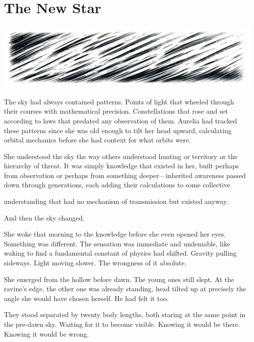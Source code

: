 \chapter{The New Star}
\label{ch:04}



\begin{center}
\includegraphics[width=\textwidth]{images/chapterImages/genesis_sketch_00058_.png}
\end{center}

The sky had always contained patterns. Points of light that wheeled through their courses with mathematical precision. Constellations that rose and set according to laws that predated any observation of them. Aurelia had tracked these patterns since she was old enough to tilt her head upward, calculating orbital mechanics before she had context for what orbits were.

She understood the sky the way others understood hunting or territory or the hierarchy of threat. It was simply knowledge that existed in her, built perhaps from observation or perhaps from something deeper—inherited awareness passed down through generations, each adding their calculations to some collective

understanding that had no mechanism of transmission but existed anyway.

And then the sky changed.

She woke that morning to the knowledge before she even opened her eyes. Something was different. The sensation was immediate and undeniable, like waking to find a fundamental constant of physics had shifted. Gravity pulling sideways. Light moving slower. The wrongness of it absolute.

She emerged from the hollow before dawn. The young ones still slept. At the ravine's edge, the other one was already standing, head tilted up at precisely the angle she would have chosen herself. He had felt it too.

They stood separated by twenty body lengths, both staring at the same point in the pre-dawn sky. Waiting for it to become visible. Knowing it would be there. Knowing it would be wrong.


